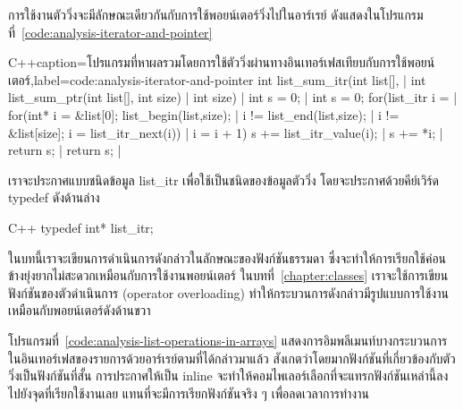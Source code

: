 การ{\wbr}ใช้{\wbr}งาน{\wbr}ตัว{\wbr}วิ่ง{\wbr}จะ{\wbr}มี{\wbr}ลักษณะ{\wbr}เดียวกัน{\wbr}กับ{\wbr}การ{\wbr}ใช้{\wbr}พอยน์เตอร์{\wbr}วิ่ง{\wbr}ไป{\wbr}ใน{\wbr}อาร์เรย์ ดัง{\wbr}แสดง{\wbr}ใน{\wbr}โปรแกรม{\wbr}ที่~\ref{code:analysis-iterator-and-pointer}

\latintext
\begin{codelist}{C++}{caption={\thaitext โปรแกรม{\wbr}ที่{\wbr}หา{\wbr}ผลรวม{\wbr}โดย{\wbr}การ{\wbr}ใช้{\wbr}ตัว{\wbr}วิ่ง{\wbr}ผ่าน{\wbr}ทาง{\wbr}อิน{\wbr}เทอร์เฟส{\wbr}เทียบ{\wbr}กับ{\wbr}การ{\wbr}ใช้{\wbr}พอยน์เตอร์\latintext},label=code:analysis-iterator-and-pointer}
int list_sum_itr(int list[],      | int list_sum_ptr(int list[],
                 int size)        |                  int size)
{                                 | {
  int s = 0;                      |   int s = 0;
  for(list_itr i =                |   for(int* i = &list[0];
        list_begin(list,size);    | 
      i != list_end(list,size);   |       i != &list[size];
      i = list_itr_next(i)) {     |       i = i + 1) {
    s += list_itr_value(i);       |     s += *i;
  }                               |   }
  return s;                       |   return s;
}                                 | }
\end{codelist}
\thaitext

เรา{\wbr}จะ{\wbr}ประกาศ{\wbr}แบบ{\wbr}ชนิด{\wbr}ข้อมูล {\ct list\_itr} เพื่อ{\wbr}ใช้{\wbr}เป็น{\wbr}ชนิด{\wbr}ของ{\wbr}ข้อมูล{\wbr}ตัว{\wbr}วิ่ง{\wbr}
โดย{\wbr}จะ{\wbr}ประกาศ{\wbr}ด้วย{\wbr}คีย์{\wbr}เวิร์ด {\ct typedef} ดัง{\wbr}ด้าน{\wbr}ล่าง{\wbr}

\latintext
\begin{codelist}{C++}{}
typedef int* list_itr;
\end{codelist}
\thaitext

ใน{\wbr}บท{\wbr}นี้{\wbr}เรา{\wbr}จะ{\wbr}เขียน{\wbr}การ{\wbr}ดำเนินการ{\wbr}ดังกล่าว{\wbr}ใน{\wbr}ลักษณะ{\wbr}ของ{\wbr}ฟังก์ชัน{\wbr}ธรรมดา{\wbr}
ซึ่ง{\wbr}จะ{\wbr}ทำ{\wbr}ให้การ{\wbr}เรียก{\wbr}ใช้{\wbr}ค่อนข้าง{\wbr}ยุ่งยาก{\wbr}ไม่{\wbr}สะดวก{\wbr}เหมือน{\wbr}กับ{\wbr}การ{\wbr}ใช้{\wbr}งาน{\wbr}พอยน์เตอร์
ใน{\wbr}บท{\wbr}ที่~\ref{chapter:classes} เรา{\wbr}จะ{\wbr}ใช้{\wbr}การ{\wbr}เขียน{\wbr}ฟังก์ชัน{\wbr}ของ{\wbr}ตัวดำเนินการ (operator
overloading) ทำ{\wbr}ให้{\wbr}กระบวนการ{\wbr}ดังกล่าว{\wbr}มี{\wbr}รูปแบบ{\wbr}การ{\wbr}ใช้{\wbr}งาน{\wbr}เหมือน{\wbr}กับ{\wbr}พอยน์เตอร์{\wbr}ดัง{\wbr}ด้าน{\wbr}ขวา{\wbr}

โปรแกรม{\wbr}ที่~\ref{code:analysis-list-operations-in-arrays}
แสดง{\wbr}การ{\wbr}อิม{\wbr}พลี{\wbr}เมนท์{\wbr}บาง{\wbr}กระบวนการ{\wbr}ใน{\wbr}อิน{\wbr}เทอร์เฟส{\wbr}ของ{\wbr}รายการ{\wbr}ด้วย{\wbr}อาร์เรย์{\wbr}ตาม{\wbr}ที่{\wbr}ได้{\wbr}กล่าว{\wbr}มา{\wbr}แล้ว{\wbr}
สังเกต{\wbr}ว่า{\wbr}โดยมาก{\wbr}ฟังก์ชัน{\wbr}ที่{\wbr}เกี่ยวข้อง{\wbr}กับ{\wbr}ตัว{\wbr}วิ่ง{\wbr}เป็น{\wbr}ฟังก์ชัน{\wbr}ที่{\wbr}สั้น การ{\wbr}ประกาศ{\wbr}ให้{\wbr}เป็น {\ct
  inline} จะ{\wbr}ทำ{\wbr}ให้{\wbr}คอม{\wbr}ไพ{\wbr}เลอร์{\wbr}เลือก{\wbr}ที่{\wbr}จะ{\wbr}แทรก{\wbr}ฟังก์ชัน{\wbr}เหล่านี้{\wbr}ลง{\wbr}ไป{\wbr}ยัง{\wbr}จุด{\wbr}ที่{\wbr}เรียก{\wbr}ใช้{\wbr}งาน{\wbr}เลย{\wbr}
แทน{\wbr}ที่{\wbr}จะ{\wbr}มี{\wbr}การ{\wbr}เรียก{\wbr}ฟังก์ชัน{\wbr}จริง ๆ เพื่อ{\wbr}ลด{\wbr}เวลา{\wbr}การ{\wbr}ทำงาน{\wbr}

